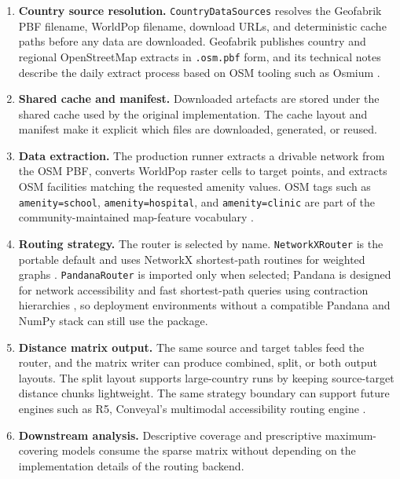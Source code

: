 \documentclass[11pt]{article}
\begin{document}
\begin{enumerate}
  \item \textbf{Country source resolution.}
  \texttt{CountryDataSources} resolves the Geofabrik PBF filename, WorldPop
  filename, download URLs, and deterministic cache paths before any data are
  downloaded.  Geofabrik publishes country and regional OpenStreetMap extracts
  in \texttt{.osm.pbf} form, and its technical notes describe the daily extract
  process based on OSM tooling such as Osmium \cite{geofabrik-download,
  geofabrik-technical}.

  \item \textbf{Shared cache and manifest.}
  Downloaded artefacts are stored under the shared cache used by the original
  implementation.  The cache layout and manifest make it explicit which files
  are downloaded, generated, or reused.

  \item \textbf{Data extraction.}
  The production runner extracts a drivable network from the OSM PBF, converts
  WorldPop raster cells to target points, and extracts OSM facilities matching
  the requested amenity values.  OSM tags such as \texttt{amenity=school},
  \texttt{amenity=hospital}, and \texttt{amenity=clinic} are part of the
  community-maintained map-feature vocabulary \cite{osm-map-features}.

  \item \textbf{Routing strategy.}
  The router is selected by name.  \texttt{NetworkXRouter} is the portable
  default and uses NetworkX shortest-path routines for weighted graphs
  \cite{networkx-shortest-path}.  \texttt{PandanaRouter} is imported only when
  selected; Pandana is designed for network accessibility and fast shortest-path
  queries using contraction hierarchies \cite{pandana-docs}, so deployment
  environments without a compatible Pandana and NumPy stack can still use the
  package.

  \item \textbf{Distance matrix output.}
  The same source and target tables feed the router, and the matrix writer can
  produce combined, split, or both output layouts.  The split layout supports
  large-country runs by keeping source-target distance chunks lightweight.
  The same strategy boundary can support future engines such as R5, Conveyal's
  multimodal accessibility routing engine \cite{r5-github}.

  \item \textbf{Downstream analysis.}
  Descriptive coverage and prescriptive maximum-covering models consume the
  sparse matrix without depending on the implementation details of the routing
  backend.
\end{enumerate}
\end{document}
